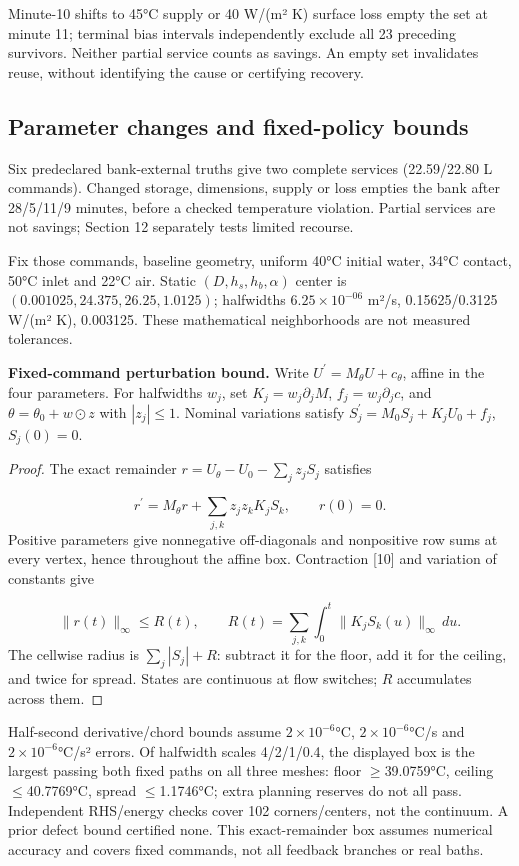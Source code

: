 \documentclass[12pt,a4paper]{article}
\begin{document}
Minute-10 shifts to 45°C supply or 40 W/(m² K) surface loss empty the set at minute 11; terminal bias intervals independently exclude all 23 preceding survivors. Neither partial service counts as savings. An empty set invalidates reuse, without identifying the cause or certifying recovery.

\subsection{Parameter changes and fixed-policy bounds}
Six predeclared bank-external truths give two complete services (22.59/22.80 L commands). Changed storage, dimensions, supply or loss empties the bank after 28/5/11/9 minutes, before a checked temperature violation. Partial services are not savings; Section 12 separately tests limited recourse.

Fix those commands, baseline geometry, uniform 40°C initial water, 34°C contact, 50°C inlet and 22°C air. Static $(D,h_s,h_b,\alpha)$ center is $(0.001025,24.375,26.25,1.0125)$; halfwidths $6.25\times10^{-06}$ m²/s, 0.15625/0.3125 W/(m² K), 0.003125. These mathematical neighborhoods are not measured tolerances.

\textbf{Fixed-command perturbation bound.} Write $U^{\prime}=M_\theta U+c_\theta$, affine in the four parameters. For halfwidths $w_j$, set $K_j=w_j\partial_jM$, $f_j=w_j\partial_jc$, and $\theta=\theta_0+w\odot z$ with $|z_j|\le1$. Nominal variations satisfy $S_j^{\prime}=M_0S_j+K_jU_0+f_j$, $S_j(0)=0$.

\begin{proof}
The exact remainder $r=U_\theta-U_0-\sum_jz_jS_j$ satisfies

\begin{equation}r^{\prime}=M_\theta r+\sum_{j,k}z_jz_kK_jS_k,\qquad r(0)=0.\end{equation}
Positive parameters give nonnegative off-diagonals and nonpositive row sums at every vertex, hence throughout the affine box. Contraction [10] and variation of constants give

\begin{equation}\|r(t)\|_\infty\le R(t),\qquad R(t)=\sum_{j,k}\int_0^t\|K_jS_k(u)\|_\infty\,du.\end{equation}
The cellwise radius is $\sum_j|S_j|+R$: subtract it for the floor, add it for the ceiling, and twice for spread. States are continuous at flow switches; $R$ accumulates across them.

\end{proof}
Half-second derivative/chord bounds assume $2\times10^{-6}$°C, $2\times10^{-6}$°C/s and $2\times10^{-6}$°C/s² errors. Of halfwidth scales 4/2/1/0.4, the displayed box is the largest passing both fixed paths on all three meshes: floor $\geq$39.0759°C, ceiling $\leq$40.7769°C, spread $\leq$1.1746°C; extra planning reserves do not all pass. Independent RHS/energy checks cover 102 corners/centers, not the continuum. A prior defect bound certified none. This exact-remainder box assumes numerical accuracy and covers fixed commands, not all feedback branches or real baths.
\end{document}
